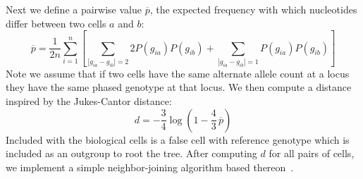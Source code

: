\documentclass[../../main.tex]{subfiles}
\begin{document}
Next we define a pairwise value $\overline{p}$, the expected frequency with which nucleotides differ between two cells $a$ and $b$:
\begin{equation*}
\overline{p} = \frac{1}{2n}\sum_{i=1}^n\left[ \sum_{|g_{ia}-g_{ib}|=2} 2P(g_{ia})P(g_{ib}) + \sum_{|g_{ia}-g_{ib}|=1} P(g_{ia})P(g_{ib})\right]
\end{equation*}
Note we assume that if two cells have the same alternate allele count at a locus they have the same phased genotype at that locus. We then compute a distance inspired by the Jukes-Cantor distance:
\begin{equation}
d = -\frac{3}{4}\log \left(1-\frac{4}{3}\,\overline{p}\right)
\end{equation}
Included with the biological cells is a false cell with reference genotype which is included as an outgroup to root the tree. After computing $d$ for all pairs of cells, we implement a simple neighbor-joining algorithm based thereon~\cite{BSA}.
\end{document}
